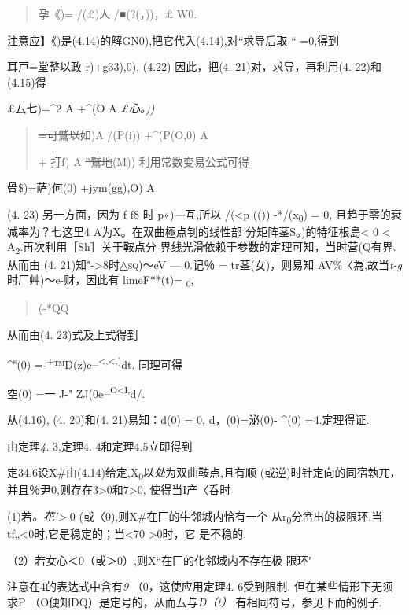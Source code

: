 \documentclass{article}
\begin{document}
\begin{quote}
孕《)= /(£)人 /■(?(，))，£ W0.
\end{quote}

注意应】《)是(4.14)的解GN0),把它代入(4.14),对``求导后取 `` =0,得到

耳戸=堂整以政 r)+g33),0), (4.22) 因此，把(4. 21)对，求导，再利用(4.
22)和(4.15)得

£厶七)=\^{}2 A +\^{}(O A \emph{£心。))}

\begin{quote}
\sout{=可鷲以}如)A /(P(i)) +\^{}(P(O,0) A

+ 打f) A \sout{''鷲地}(M)) 利用常数变易公式可得
\end{quote}

骨\$)=萨)何(0) +jym(gg),O) A

(4. 23) 另一方面，因为 f f8 时 p«)---互,所以 /(\textless{}p (())
-*/(x\textsubscript{0}) = 0, 且趋于零的衰减率为？七这里4
A为X。在双曲極点钊的线性部 分矩阵茎S。)的特征根島\textless{} 0
\textless{} A\textsubscript{2}.再次利用［Sh］关于鞍点分
界线光滑依赖于参数的定理可知，当时营(Q有界.从而由 (4.
21)知"-\textgreater{}8时\textsc{△sq)}〜eV --- 0.记％ = tr茎(女)，则易知
AV\%〈為,故当\emph{t-g}时厂艸)〜e-财，因此有 limeF**(t)=
\textsubscript{0},

\begin{quote}
(-*QQ
\end{quote}

从而由(4. 23)式及上式得到

\^{}\textsuperscript{s}(0)
=-\textbar{}\textsuperscript{+}™D(z)e\textsuperscript{\_\textless{},\textless{},)}dt.
同理可得

空(0) =一 J-" ZJ(0e\textsuperscript{\_O\textless{}I,}d/.

从(4.16), (4. 20)和(4. 21)易知：d(0) = 0, d，(0)=泌(0)- \^{}(0)
=4.定理得证.\textbar{}

由定理\emph{4.} 3,定理4. 4和定理4.5立即得到

定34.6设X\#由(4.14)给定,X\textsubscript{0}以\emph{处}为双曲鞍点,且有顺
(或逆)时针定向的同宿執兀，并且％尹0,则存在3\textgreater{}0和7\textgreater{}0,
使得当I产\textbar{}〈呑时

(1)若\emph{。花'\textgreater{}} 0 (或〈0),则X\#在匚的牛邻城内恰有一个
从r\textsubscript{0}分岔出的极限环.当tf„\textless{}0时,它是稳定的；当\textless{}70
\textgreater{}0时，它 是不稳的.

（2）若女心＜0（或＞0）,则X``在匚的化邻域内不存在极 限环"

注意在4的表达式中含有\emph{9} （0，这使应用定理4. 6受到限制.
但在某些情形下无须求P （O便知DQ）是定号的，从而厶与\emph{D（t）}
有相同符号，参见下而的例子.
\end{document}
